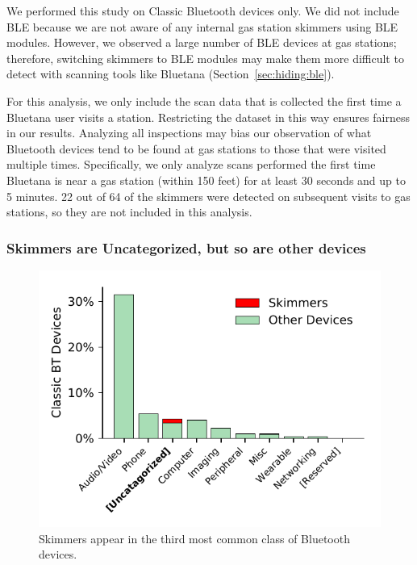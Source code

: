 %
We performed this study on Classic Bluetooth devices only.
%
We did not include BLE because we are not
aware of any internal gas station skimmers using BLE modules.
%
However, we observed a large number of BLE devices at gas stations; therefore, switching skimmers to
BLE modules may make them more difficult to detect with
scanning tools like Bluetana (Section~\ref{sec:hiding:ble}).


%
%
For this analysis, we only include the scan data that is collected the first
time a Bluetana user visits a station.
%
Restricting the dataset in this way ensures fairness in our results. Analyzing all
inspections may bias our observation of what Bluetooth devices tend to be found at gas stations to those that
were visited multiple times.
%
Specifically, we only analyze scans
performed the first time Bluetana is near a gas station (within 150 feet) for
at least 30 seconds and up to 5 minutes.
%
22 out of 64 of the skimmers were detected on subsequent
visits to gas stations, so they are not included in this analysis.
% 
%


\subsubsection*{Skimmers are Uncategorized, but so are other devices} %

\begin{figure}
\centering
\includegraphics[width=\linewidth]{skimmer/plots/hist_device_class.pdf}
\caption{
\label{fig:hist_device_class}
Skimmers appear in the third most common class of Bluetooth devices.
}
\end{figure}

